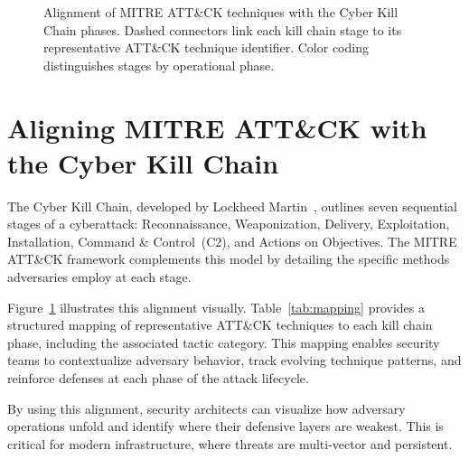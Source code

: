 \documentclass[sigconf,nonacm]{acmart}
\begin{document}
\begin{figure}[t]
\caption{Alignment of MITRE ATT\&CK techniques with the Cyber Kill Chain phases.
  Dashed connectors link each kill chain stage to its representative ATT\&CK
  technique identifier. Color coding distinguishes stages by operational phase.}
\label{fig:killchain}
\end{figure}

\section{Aligning MITRE ATT\&CK with the Cyber Kill Chain}
\label{sec:alignment}

The Cyber Kill Chain, developed by Lockheed Martin~\cite{lockheed2011}, outlines
seven sequential stages of a cyberattack: Reconnaissance, Weaponization, Delivery,
Exploitation, Installation, Command \& Control~(C2), and Actions on Objectives.
The MITRE ATT\&CK framework complements this model by detailing the specific
methods adversaries employ at each stage.

Figure~\ref{fig:killchain} illustrates this alignment visually. Table~\ref{tab:mapping}
provides a structured mapping of representative ATT\&CK techniques to each kill
chain phase, including the associated tactic category. This mapping enables security
teams to contextualize adversary behavior, track evolving technique patterns, and
reinforce defenses at each phase of the attack lifecycle.

By using this alignment, security architects can visualize how adversary operations
unfold and identify where their defensive layers are weakest. This is critical for
modern infrastructure, where threats are multi-vector and persistent.
\end{document}
